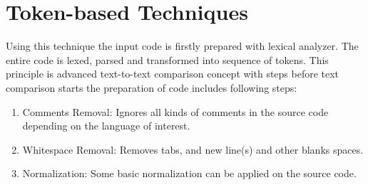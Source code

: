 \documentclass{report}
\begin{document}
\section{Token-based Techniques}
\label{sec: tocken_tech}

Using this technique the input code is firstly prepared with lexical analyzer. The entire code is lexed, parsed and transformed into sequence of tokens. This principle is advanced text-to-text comparison concept with steps before text comparison starts the preparation of code includes following steps:
\begin{enumerate}
  \item Comments Removal: Ignores all kinds of comments in the source code depending on the language of interest.
  \item Whitespace Removal: Removes tabs, and new line(s) and other blanks spaces.
  \item Normalization: Some basic normalization can be applied on the source code.
\end{enumerate}
\end{document}

